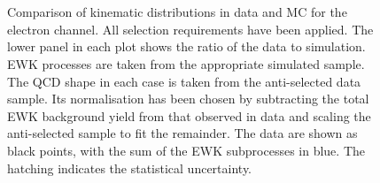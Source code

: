 \begin{figure}[h!]
\centering
{}
\\
\\
\caption[Kinematic distributions in data and \acs{MC} for the electron
channel]{Comparison of kinematic distributions in data and \acs{MC} for the
  electron channel. All selection requirements have been applied. The lower
  panel in each plot shows the ratio of the data to simulation. \ac{EWK}
  processes are taken from the appropriate simulated sample. The \ac{QCD}
  shape in each case is taken from the anti-selected data sample. Its
  normalisation has been chosen by subtracting the total \ac{EWK} background
  yield from that observed in data and scaling the anti-selected sample to fit
  the remainder. The data are shown as black points, with the sum of the
  \ac{EWK} subprocesses in blue. The hatching indicates the statistical
  uncertainty.}
\label{fig:wpol_datamc_ele}
\end{figure}

